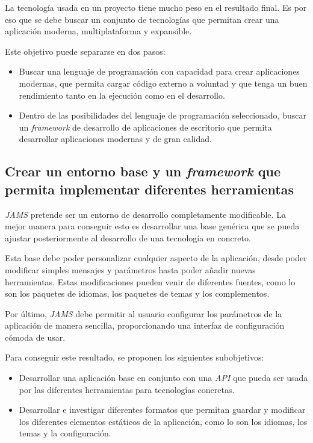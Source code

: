 La tecnología usada en un proyecto tiene mucho peso en el resultado final.
Es por eso que se debe buscar un conjunto de tecnologías que permitan crear una aplicación
moderna, multiplataforma y expansible.

\noexpand Este objetivo puede separarse en dos pasos:
\begin{itemize}
    \item Buscar una lenguaje de programación con capacidad para crear aplicaciones modernas,
    que permita cargar código externo a voluntad y que tenga un buen rendimiento
    tanto en la ejecución como en el desarrollo.
    \item Dentro de las posibilidades del lenguaje de programación seleccionado,
    buscar un \textit{framework} de desarrollo de aplicaciones de escritorio
    que permita desarrollar aplicaciones modernas y de gran calidad.
\end{itemize}

\subsection{Crear un entorno base y un \textit{framework} que permita implementar diferentes herramientas}
\label{subsec:crear-un-entorno-base-y-un-framework-que-permita-implementar-diferentes-herramientas}

\textit{JAMS} pretende ser un entorno de desarrollo completamente modificable.
La mejor manera para conseguir esto es desarrollar una base genérica
que se pueda ajustar posteriormente al desarrollo de una tecnología en concreto.

\noindent Esta base debe poder personalizar cualquier aspecto de la aplicación,
desde poder modificar simples mensajes y parámetros hasta poder
añadir nuevas herramientas.
Estas modificaciones pueden venir de diferentes fuentes, como lo son
los paquetes de idiomas, los paquetes de temas y los complementos.

\noindent Por último, \textit{JAMS} debe permitir al usuario configurar los parámetros
de la aplicación de manera sencilla, proporcionando una interfaz de configuración
cómoda de usar.

\noindent Para conseguir este resultado, se proponen los siguientes subobjetivos:
\begin{itemize}
    \item Desarrollar una aplicación base en conjunto con una \textit{API} que pueda
    ser usada por las diferentes herramientas para tecnologías concretas.
    \item Desarrollar e investigar diferentes formatos que permitan guardar
    y modificar los diferentes elementos estáticos de la aplicación, como lo son
    los idiomas, los temas y la configuración.
\end{itemize}

